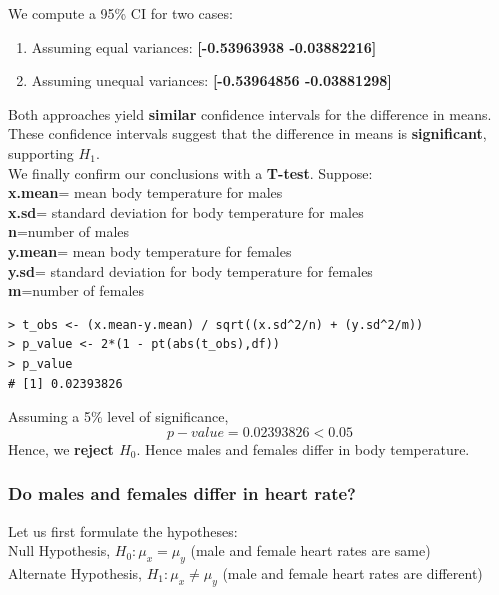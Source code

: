 \documentclass[12pt,letterpaper,titlepage,en-US]{article}
\begin{document}
We compute a 95\% CI for two cases:
\begin{enumerate}
\item Assuming equal variances: \textbf{[-0.53963938 -0.03882216]}
\item Assuming unequal variances: \textbf{[-0.53964856 -0.03881298]}

\end{enumerate}
Both approaches yield \textbf{similar} confidence intervals for the difference in means. These confidence intervals suggest that the difference in means is \textbf{significant}, supporting \textbf{$H_{1}$}.\\

We finally confirm our conclusions with a \textbf{T-test}. Suppose:\\
\textbf{x.mean}= mean body temperature for males \\
\textbf{x.sd}= standard deviation for body temperature for males\\
\textbf{n}=number of males\\
\textbf{y.mean}= mean body temperature for females \\
\textbf{y.sd}= standard deviation for body temperature for females\\
\textbf{m}=number of females
\begin{knitrout}
\color{fgcolor}
\begin{kframe}
\begin{verbatim}
> t_obs <- (x.mean-y.mean) / sqrt((x.sd^2/n) + (y.sd^2/m))
> p_value <- 2*(1 - pt(abs(t_obs),df))
> p_value
# [1] 0.02393826
\end{verbatim}
\end{kframe}
\end{knitrout}

Assuming a 5\% level of significance,\\
\begin{equation}
p-value = 0.02393826 < 0.05
\end{equation}
Hence, we \textbf{reject $H_{0}$}. Hence males and females differ in body temperature.

\subsubsection{Do males and females differ in heart rate?}
Let us first formulate the hypotheses:\\
Null Hypothesis, $H_{0}: \mu_{x}=\mu_{y}$ (male and female heart rates are same)\\
\indent Alternate Hypothesis, $H_{1}: \mu_{x} \neq \mu_{y}$ (male and female heart rates are different)
\\
\end{document}
